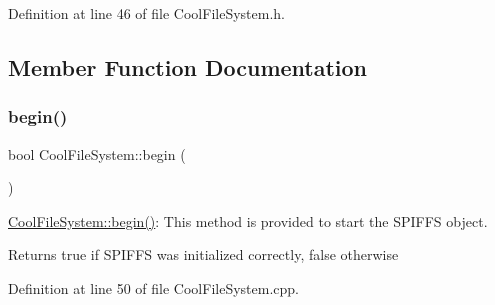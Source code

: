 Definition at line 46 of file Cool\+File\+System.\+h.



\subsection{Member Function Documentation}
\mbox{\label{class_cool_file_system_a6ba6f666ed4c530174f8569d2c636748}} 
\subsubsection{\texorpdfstring{begin()}{begin()}}
{\footnotesize\ttfamily bool Cool\+File\+System\+::begin (\begin{DoxyParamCaption}{ }\end{DoxyParamCaption})}

\hyperlink{class_cool_file_system_a6ba6f666ed4c530174f8569d2c636748}{Cool\+File\+System\+::begin()}\+: This method is provided to start the S\+P\+I\+F\+FS object.

\begin{DoxyReturn}{Returns}
true if S\+P\+I\+F\+FS was initialized correctly, false otherwise 
\end{DoxyReturn}


Definition at line 50 of file Cool\+File\+System.\+cpp.



